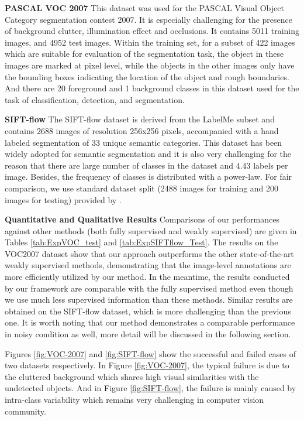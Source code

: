 \textbf{PASCAL VOC 2007}
This dataset was used for the PASCAL Visual Object Category segmentation contest 2007. It is especially challenging for the presence of background clutter, illumination effect and occlusions. It contains 5011 training images, and 4952 test images. Within the training set, for a subset of 422 images which are suitable for evaluation of the segmentation task, the object in these images are marked at pixel level, while the objects in the other images only have the bounding boxes indicating the location of the object and rough boundaries. And there are 20 foreground and 1 background classes in this dataset used for the task of classification, detection, and segmentation.


\textbf{SIFT-flow} The SIFT-flow dataset\cite{liu2011nonparametric} is derived from the LabelMe subset and contains 2688 images of resolution 256x256 pixels, accompanied with a hand labeled segmentation of 33 unique semantic categories. This dataset has been widely adopted for semantic segmentation and it is also very challenging for the reason that there are large number of classes in the dataset and $4.43$ labels per image. Besides, the frequency of classes is distributed with a power-law. For fair comparison, we use standard dataset split (2488 images for training and 200 images for testing) provided by \cite{liu2011nonparametric}.

\textbf{Quantitative and Qualitative Results} Comparisons of our performances against other methods (both fully supervised and weakly supervised) are given in Tables \ref{tab:ExpVOC_test} and \ref{tab:ExpSIFTflow_Test}. The results on the VOC2007 dataset show that our approach outperforms the other state-of-the-art weakly supervised methods, demonstrating that the image-level annotations are more efficiently utilized by our method. In the meantime, the results conducted by our framework are comparable with the fully supervised method even though we use much less supervised information than these methods. Similar results are obtained on the SIFT-flow dataset, which is more challenging than the previous one. It is worth noting that our method demonstrates a comparable performance in noisy condition as well, more detail will be discussed in the following section.

Figures \ref{fig:VOC-2007} and \ref{fig:SIFT-flow} show the successful and failed cases of two datasets respectively. In Figure \ref{fig:VOC-2007}, the typical failure is due to the cluttered background which shares high visual similarities with the undetected objects. And in Figure \ref{fig:SIFT-flow}, the failure is mainly caused by intra-class variability which remains very challenging in computer vision community.


